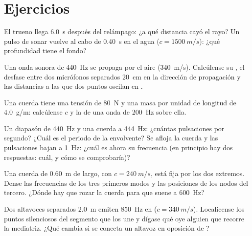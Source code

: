 \section{Ejercicios}

\begin{exercise}[$\star$]\label{exo:b1:wave-propagation:1}
El trueno llega \qty{6.0}{s} después del relámpago: ¿a qué distancia cayó
el rayo? Un pulso de sonar vuelve al cabo de \qty{0.40}{s} en el agua
($c = \qty{1500}{m/s}$): ¿qué profundidad tiene el fondo?
\end{exercise}

\begin{exercise}[$\star$]\label{exo:b1:wave-propagation:2}
Una onda sonora de \qty{440}{Hz} se propaga por el aire (\qty{340}{m/s}).
Calcúlense su , el desfase entre dos micrófonos separados
\qty{20}{cm} en la dirección de propagación y las distancias a las que dos
puntos oscilan en .
\end{exercise}

\begin{exercise}[$\star$]\label{exo:b1:wave-propagation:3}
Una cuerda tiene una tensión de \qty{80}{N} y una masa por unidad de
longitud de \qty{4.0}{g/m}: calcúlense $c$ y la  de una
onda de \qty{200}{Hz} sobre ella.
\end{exercise}

\begin{exercise}[$\star$]\label{exo:b1:wave-propagation:4}
Un diapasón de \qty{440}{Hz} y una cuerda a \qty{444}{Hz}: ¿cuántas
pulsaciones por segundo? ¿Cuál es el periodo de la envolvente? Se afloja
la cuerda y las pulsaciones bajan a \qty{1}{Hz}: ¿cuál es ahora su
frecuencia (en principio hay dos respuestas: cuál, y cómo se comprobaría)?
\end{exercise}

\begin{exercise}[$\star\star$]\label{exo:b1:wave-propagation:5}
Una cuerda de \qty{0.60}{m} de largo, con $c = \qty{240}{m/s}$, está fija
por los dos extremos. Dense las frecuencias de los tres primeros modos y
las posiciones de los nodos del tercero. ¿Dónde hay que rozar la cuerda
para que suene a \qty{600}{Hz}?
\end{exercise}

\begin{exercise}[$\star\star$]\label{exo:b1:wave-propagation:6}
Dos altavoces separados \qty{2.0}{m} emiten \qty{850}{Hz} en 
($c = \qty{340}{m/s}$). Localícense los puntos silenciosos del segmento
que los une y dígase qué oye alguien que recorre la mediatriz. ¿Qué cambia
si se conecta un altavoz en oposición de ?
\end{exercise}

